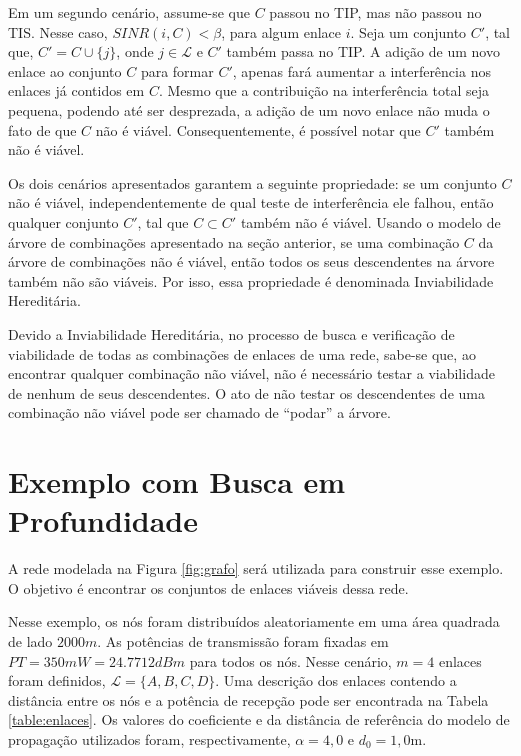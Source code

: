 Em um segundo cenário, assume-se que $C$ passou no TIP, mas não passou no TIS. Nesse caso, $SINR(i,C) < \beta$, para algum enlace $i$. Seja um conjunto $C'$, tal que, $C' = C \cup \{j\}$, onde $j \in \mathcal{L}$ e $C'$ também passa no TIP. A adição de um novo enlace ao conjunto $C$ para formar $C'$, apenas fará aumentar a interferência nos enlaces já contidos em $C$. Mesmo que a contribuição na interferência total seja pequena, podendo até ser desprezada, a adição de um novo enlace não muda o fato de que $C$ não é viável. Consequentemente, é possível notar que $C'$ também não é viável.

Os dois cenários apresentados garantem a seguinte propriedade: se um conjunto $C$ não é viável, independentemente de qual teste de interferência ele falhou, então qualquer conjunto $C'$, tal que $C \subset C'$ também não é viável. Usando o modelo de árvore de combinações apresentado na seção anterior, se uma combinação $C$ da árvore de combinações não é viável, então todos os seus descendentes na árvore também não são viáveis. Por isso, essa propriedade é denominada Inviabilidade Hereditária. 

Devido a Inviabilidade Hereditária, no processo de busca e verificação de viabilidade de todas as combinações de enlaces de uma rede, sabe-se que, ao encontrar qualquer combinação não viável, não é necessário testar a viabilidade de nenhum de seus descendentes. O ato de não testar os descendentes de uma combinação não viável pode ser chamado de ``podar'' a árvore. 

\section{Exemplo com Busca em Profundidade}
\label{section:bp}

A rede modelada na Figura \ref{fig:grafo} será utilizada para construir esse exemplo. O objetivo é encontrar os conjuntos de enlaces viáveis dessa rede. 

Nesse exemplo, os nós foram distribuídos aleatoriamente em uma área quadrada de lado $2000m$. As potências de transmissão foram fixadas em $PT=350mW=24.7712dBm$ para todos os nós. Nesse cenário, $m=4$ enlaces foram definidos, $\mathcal{L}=\{A, B, C, D\}$. Uma descrição dos enlaces contendo a distância entre os nós e a potência de recepção pode ser encontrada na Tabela \ref{table:enlaces}. Os valores do coeficiente e da distância de referência do modelo de propagação utilizados foram, respectivamente, $\alpha=4,0$ e $d_0=1,0$m.

